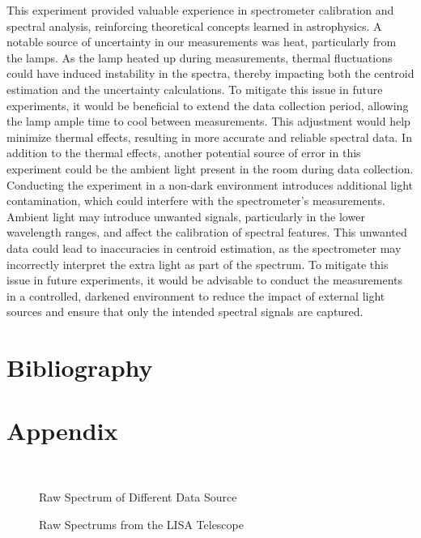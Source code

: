 \documentclass[10pt, preprint]{aastex}
\begin{document}
This experiment provided valuable experience in spectrometer calibration and spectral analysis, reinforcing theoretical concepts learned in astrophysics. A notable source of uncertainty in our measurements was heat, particularly from the lamps. As the lamp heated up during measurements, thermal fluctuations could have induced instability in the spectra, thereby impacting both the centroid estimation and the uncertainty calculations. To mitigate this issue in future experiments, it would be beneficial to extend the data collection period, allowing the lamp ample time to cool between measurements. This adjustment would help minimize thermal effects, resulting in more accurate and reliable spectral data. In addition to the thermal effects, another potential source of error in this experiment could be the ambient light present in the room during data collection. Conducting the experiment in a non-dark environment introduces additional light contamination, which could interfere with the spectrometer’s measurements. Ambient light may introduce unwanted signals, particularly in the lower wavelength ranges, and affect the calibration of spectral features. This unwanted data could lead to inaccuracies in centroid estimation, as the spectrometer may incorrectly interpret the extra light as part of the spectrum. To mitigate this issue in future experiments, it would be advisable to conduct the measurements in a controlled, darkened environment to reduce the impact of external light sources and ensure that only the intended spectral signals are captured.

\section{Bibliography}



\section*{Appendix} \label{Appendix}

\begin{figure}[H]
  \centering
  \label{fig:raw_hy}
  \hfill
  \label{fig:raw_dark}
  \\
  \label{fig:raw_amb}
  \hfill
  \caption{\label{fig:raw} Raw Spectrum of Different Data Source}
\end{figure}
\begin{figure}[H]
  \centering
  \hfill
  \caption{\label{fig:spec} Raw Spectrums from the LISA Telescope }
\end{figure}
\end{document}
